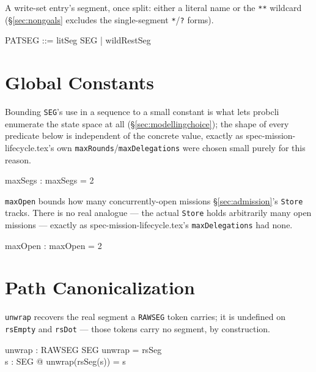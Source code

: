 \documentclass[a4paper,10pt,fleqn]{article}
\newcommand{\field}[1]{\texttt{#1}}
\begin{document}
A write-set entry's segment, once split: either a literal name or the
\texttt{**} wildcard (\S\ref{sec:nongoals} excludes the single-segment
\texttt{*}/\texttt{?} forms).

\begin{zed}
PATSEG ::= litSeg \ldata SEG \rdata | wildRestSeg
\end{zed}

\section{Global Constants}
\label{sec:constants}

Bounding \field{SEG}'s use in a sequence to a small constant is what
lets probcli enumerate the state space at all
(\S\ref{sec:modellingchoice}); the shape of every predicate below is
independent of the concrete value, exactly as
spec-mission-lifecycle.tex's own \field{maxRounds}/\field{maxDelegations}
were chosen small purely for this reason.

\begin{axdef}
maxSegs : \nat
\where
maxSegs = 2
\end{axdef}

\field{maxOpen} bounds how many concurrently-open missions
\S\ref{sec:admission}'s \field{Store} tracks. There is no real
analogue --- the actual \field{Store} holds arbitrarily many open
missions --- exactly as spec-mission-lifecycle.tex's
\field{maxDelegations} had none.

\begin{axdef}
maxOpen : \nat
\where
maxOpen = 2
\end{axdef}

\section{Path Canonicalization}
\label{sec:canonical}

\field{unwrap} recovers the real segment a \field{RAWSEG} token
carries; it is undefined on \field{rsEmpty} and \field{rsDot} ---
those tokens carry no segment, by construction.

\begin{axdef}
unwrap : RAWSEG \pfun SEG
\where
\dom unwrap = \ran rsSeg \\
\forall s : SEG @ unwrap(rsSeg(s)) = s
\end{axdef}
\end{document}
